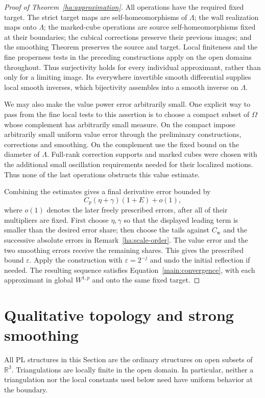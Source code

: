 \documentclass[11pt]{article}
\numberwithin{equation}{section}
\theoremstyle{definition}
\theoremstyle{remark}
\begin{document}
\begin{proof}[Proof of Theorem~\ref{ha:approximation}]
All operations have the required fixed target.  The strict target
maps are self-homeomorphisms of $\Lambda$; the wall realization
maps onto $\Lambda$; the marked-cube operations are source
self-homeomorphisms fixed at their boundaries; the cubical
corrections preserve their previous images; and the smoothing
Theorem preserves the source and target.  Local finiteness and the
fine properness tests in the preceding constructions apply on the
open domains throughout.
Thus surjectivity holds for every individual approximant, rather
than only for a limiting image.  Its everywhere invertible smooth
differential supplies local smooth inverses, which bijectivity
assembles into a smooth inverse on $\Lambda$.

We may also make the value power error arbitrarily small.  One
explicit way to pass from the fine local tests to this assertion is
to choose a compact subset of $\Omega$ whose complement has
arbitrarily small measure.  On the compact impose arbitrarily small
uniform value error through the preliminary constructions,
corrections and smoothing.  On the complement use the fixed bound
on the diameter of $\Lambda$.  Full-rank correction supports and
marked cubes were chosen with the additional small oscillation
requirements needed for their localized motions.  Thus none of the
last operations obstructs this value estimate.

Combining the estimates gives a final derivative error bounded by
\[
                    C_p(\eta+\gamma)(1+E)+o(1),
\]
where $o(1)$ denotes the later freely prescribed errors, after all
of their multipliers are fixed.  First choose $\eta,\gamma$ so that
the displayed leading term is smaller than the desired error share;
then choose the tails against $C_{\mathrm w}$ and the successive
absolute errors in Remark~\ref{ha:scale-order}.  The value error
and the two smoothing errors receive the remaining shares.  This
gives the prescribed bound $\varepsilon$.  Apply the construction with
$\varepsilon=2^{-j}$ and undo the initial reflection if needed.
The resulting sequence satisfies Equation~\eqref{main:convergence},
with each approximant in global $W^{1,p}$ and onto the same fixed target.
\end{proof}

\appendix
\section{Qualitative topology and strong smoothing}
\label{sec:smoothing}

All PL structures in this Section are the ordinary structures on open
subsets of $\mathbb R^3$.  Triangulations are locally finite in the open domain.
In particular, neither a triangulation nor the local constants used below
need have uniform behavior at the boundary.
\end{document}
